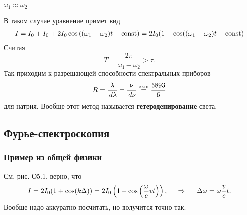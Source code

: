 $\omega_1 \approx \omega_2$

\noindent
В таком случае уравнение примет вид
\begin{align*}
    I = I_0 + I_0 + 2 I_0 \cos \left(
        (\omega_1 - \omega_2) t + \text{const}
    \right) = 2 I_0 (1 + \cos((\omega_1 - \omega_2)t + \text{const})
\end{align*}
Считая
\begin{equation*}
    T = \frac{2\pi}{\omega_1 - \omega_2} > \tau.
\end{equation*}
Так приходим к разрешающей способности спектральных приборов
\begin{equation*}
    R = \frac{\lambda}{\, d \lambda} = \frac{\nu}{\, d \nu}  \overset{\mathrm{exm}}{=} \frac{5893}{6}
\end{equation*}
для натрия. Вообще этот метод называется \textbf{гетероденирование} света.

% 

\subsection{Фурье-спектроскопия}

\subsubsection*{Пример из общей физики}

См. рис. О5.1, верно, что
\begin{equation*}
    I = 2 I_0 (1 + \cos (k \Delta)) = 2 I_0 \left( 1 + \cos \left(
            \frac{\omega}{c} v t
        \right)\right),
        \hspace{0.5cm} \Rightarrow \hspace{0.5cm}
        \Delta \omega = \omega \frac{v}{c}t.
\end{equation*}
Вообще надо аккуратно посчитать, но получится точно так. 

